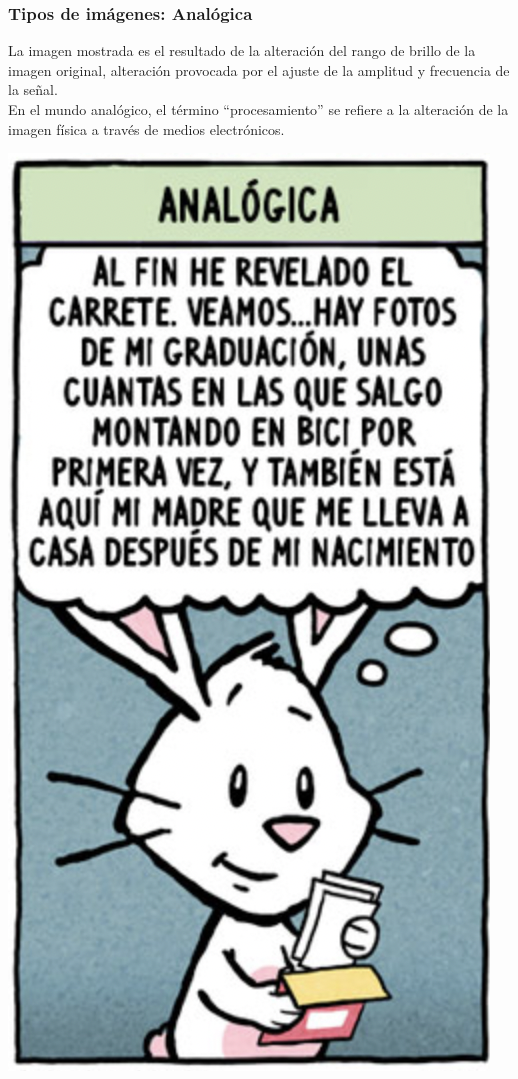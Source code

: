 \documentclass[
10pt, %
aspectratio=169, %
]{beamer}
\begin{document}
	\begin{frame}
		
		\frametitle{Tipos de imágenes: Analógica}
		
		\noindent\begin{minipage}{.5\textwidth}
			La imagen mostrada es el resultado de la alteración del rango de brillo de la imagen original, alteración provocada por el ajuste de la amplitud y frecuencia de la señal.\\[2mm]
			
			En el mundo analógico, el término ``procesamiento'' se refiere a la alteración de la imagen física a través de medios electrónicos.
			
		\end{minipage}%
		\begin{minipage}{.55\textwidth}
			\centering
			\includegraphics[scale=0.43]{analogica.png} 
				

\end{minipage}
\end{frame}
\end{document}
